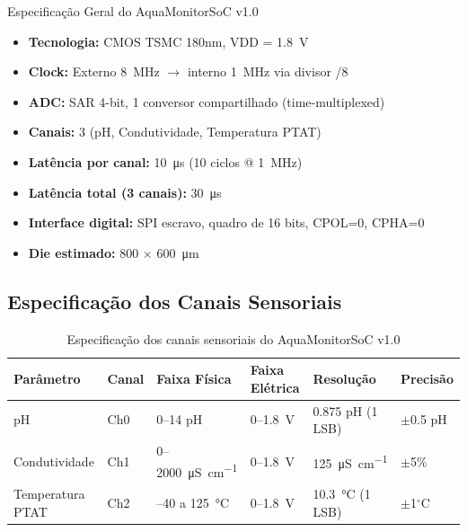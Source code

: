 \documentclass[12pt,a4paper]{article}
\begin{document}
\begin{specbox}{Especificação Geral do AquaMonitorSoC v1.0}
\begin{itemize}
  \item \textbf{Tecnologia:} CMOS TSMC 180nm, VDD = \SI{1.8}{\volt}
  \item \textbf{Clock:} Externo \SI{8}{\mega\hertz} $\to$ interno \SI{1}{\mega\hertz} via divisor /8
  \item \textbf{ADC:} SAR 4-bit, 1 conversor compartilhado (time-multiplexed)
  \item \textbf{Canais:} 3 (pH, Condutividade, Temperatura PTAT)
  \item \textbf{Latência por canal:} \SI{10}{\micro\second} (10 ciclos @ \SI{1}{\mega\hertz})
  \item \textbf{Latência total (3 canais):} \SI{30}{\micro\second}
  \item \textbf{Interface digital:} SPI escravo, quadro de 16 bits, CPOL=0, CPHA=0
  \item \textbf{Die estimado:} 800 $\times$ \SI{600}{\micro\meter}
\end{itemize}
\end{specbox}

\subsection{Especificação dos Canais Sensoriais}

\begin{table}[H]
  \centering
  \caption{Especificação dos canais sensoriais do AquaMonitorSoC v1.0}
  \label{tab:sensor_spec}
  \begin{tabularx}{\textwidth}{lXXXXX}
    \toprule
    \textbf{Parâmetro} & \textbf{Canal} & \textbf{Faixa Física} &
    \textbf{Faixa Elétrica} & \textbf{Resolução} & \textbf{Precisão} \\
    \midrule
    pH               & Ch0 & 0--14 pH        & 0--\SI{1.8}{\volt}  &
      0.875 pH (1 LSB) & $\pm$0.5 pH \\
    Condutividade    & Ch1 & 0--\SI{2000}{\micro\siemens\per\centi\meter} &
      0--\SI{1.8}{\volt} & \SI{125}{\micro\siemens\per\centi\meter} & $\pm$5\% \\
    Temperatura PTAT & Ch2 & --40 a \SI{125}{\celsius} & 0--\SI{1.8}{\volt} &
      \SI{10.3}{\celsius} (1 LSB) & $\pm$1$^\circ$C \\
    \bottomrule
  \end{tabularx}
\end{table}
\end{document}
